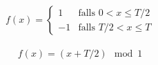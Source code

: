\vspace*{-1ex}
            \begin{align*}
                f(x) = \begin{cases}
                    1 & \text{falls } 0 < x \leq T/2 \\
                    -1 & \text{falls } T/2 < x \leq T
                \end{cases}
            \end{align*}

\vspace*{-1ex}
            \begin{align*}
                f(x) = (x + T/2) \mod 1
            \end{align*}